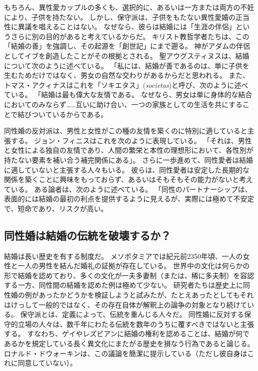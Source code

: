 \documentclass[paper=a4,book,openany]{jlreq}
\newcommand{\ig}[1]{}           %
\begin{document}
もちろん、異性愛カップルの多くも、選択的に、あるいは一方または両方の不妊により、子供を持たない。
しかし、保守派は、子供をもたない異性愛婚の正当性に異議を唱えることはない。
なぜなら、彼らは結婚には「生涯の伴侶」というさらに別の目的があると考えているからだ。
キリスト教哲学者たちは、この「結婚の善」を強調し、その起源を「創世記」にまで遡る。
神がアダムの伴侶としてイブを創造したことがその根拠とされる。
聖アウグスティヌスは、結婚について次のように述べている。
「私には、結婚が善であるのは、単に子供を生むためだけではなく、男女の自然な交わりがあるからだと思われる\citep[3.3]{augustine98:_excel_marriag}。
また、トマス・アクィナスはこれを「ソキエタス」(\emph{societas})と呼び、次のように述べている。
「結婚は最も偉大な友情である。
なぜなら、男女は単に身体的な結合においてのみならず……互いに助け合い、一つの家族としての生活を共にすることで結びついているからである\citep[III c. 123 n. 6 (2964)]{aquinas55:_summa_gentil}。

同性婚の反対派は、男性と女性がこの種の友情を築くのに特別に適していると主張する。
ジョン・フィニスはこれを次のように表現している。
「それは、男性と女性による独自の友情であり、人間の繁栄と本性の理想形において、各性別が持たない要素を補い合う補完関係にある」\citep[p.398]{finnis08:_marriag}。
さらに一歩進めて、同性愛者は結婚に適していないと主張する人々もいる。
彼らは、同性愛者は安定した長期的な関係を築くことに興味をもっておらず、あるいはそもそもその能力がないと考えている。
ある論者は、次のように述べている。
「同性のパートナーシップは、表面的には結婚の最初の利点を提供するように見えるが、実際には極めて不安定で、短命であり、リスクが高い\citep{fischer13:_purpos_marriag}。

\subsection{同性婚は結婚の伝統を破壊するか？}

結婚は長い歴史を有する制度だ。
メソポタミアでは紀元前2350年頃、一人の女性と一人の男性を結んだ婚礼の証拠が存在している。
世界中の文化は何らかの形で結婚を認めており、多くの文化が一夫多妻制（または、稀に多夫制）を容認する一方、同性間の結婚を認めた例は極めて少ない。
研究者たちは歴史上に同性婚の例があったかどうかを検証しようと試みたが、たとえあったとしてもそれはけっして一般的ではなく、その存在自体が解釈上の論争の対象となり続けている\citep{boswell94:_same_sex_union_pre_moder_europ,shaw94:_review_boswel}。
保守派とは、定義によって、伝統を重んじる人々だ。
同性婚に反対する保守的立場の人々は、数千年にわたる伝統を数年のうちに覆すべきではないと主張する。
すなわち、ゲイやレズビアンに結婚の権利を認めることは、結婚が何であるかを規定している長く異文化にまたがる歴史を損なう行為であると論じる。
ロナルド・ドウォーキン\ig{Ronald Dworkin}は、この議論を簡潔に提示している（ただし彼自身はこれに同意していない）。
\end{document}
